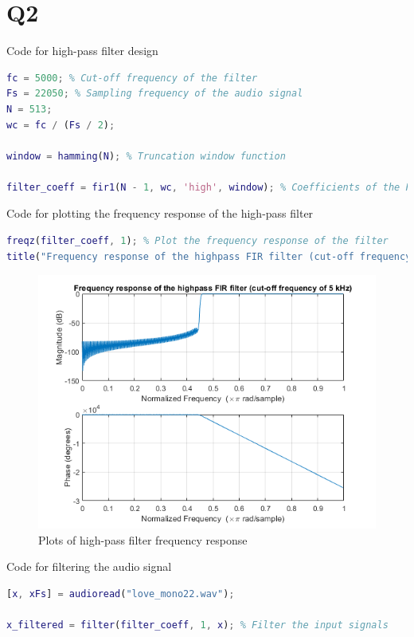 \documentclass{article}
\begin{document}
\section*{Q2}

Code for high-pass filter design
\begin{lstlisting}[language=Matlab]
fc = 5000; % Cut-off frequency of the filter
Fs = 22050; % Sampling frequency of the audio signal
N = 513;
wc = fc / (Fs / 2);

window = hamming(N); % Truncation window function

filter_coeff = fir1(N - 1, wc, 'high', window); % Coefficients of the FIR filter
\end{lstlisting}

Code for plotting the frequency response of the high-pass filter
\begin{lstlisting}[language=Matlab]
freqz(filter_coeff, 1); % Plot the frequency response of the filter
title("Frequency response of the highpass FIR filter (cut-off frequency of 5 kHz)");
\end{lstlisting}

\begin{figure}[h!]
\includegraphics[width=\textwidth]{HPF.png}
\caption{Plots of high-pass filter frequency response}
\end{figure}

Code for filtering the audio signal
\begin{lstlisting}[language=Matlab]
[x, xFs] = audioread("love_mono22.wav");

x_filtered = filter(filter_coeff, 1, x); % Filter the input signals
\end{lstlisting}
\end{document}
